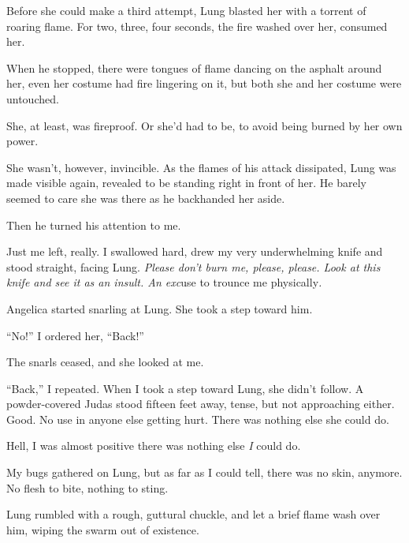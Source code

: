 Before she could make a third attempt, Lung blasted her with a torrent of roaring flame.  For two, three, four seconds, the fire washed over her, consumed her.



When he stopped, there were tongues of flame dancing on the asphalt around her, even her costume had fire lingering on it, but both she and her costume were untouched.



She, at least, was fireproof.  Or she'd had to be, to avoid being burned by her own power.



She wasn't, however, invincible.  As the flames of his attack dissipated, Lung was made visible again, revealed to be standing right in front of her.  He barely seemed to care she was there as he backhanded her aside.



Then he turned his attention to me.



Just me left, really.  I swallowed hard, drew my very underwhelming knife and stood straight, facing Lung.  \emph{Please don't burn me, please, please.  Look at this knife and see it as an insult.  An exc}use to trounce me physically\emph{.}



Angelica started snarling at Lung.  She took a step toward him.



``No!'' I ordered her, ``Back!''



The snarls ceased, and she looked at me.



``Back,'' I repeated.  When I took a step toward Lung, she didn't follow.  A powder-covered Judas stood fifteen feet away, tense, but not approaching either.  Good.  No use in anyone else getting hurt.  There was nothing else she could do.



Hell, I was almost positive there was nothing else \emph{I }could do.



My bugs gathered on Lung, but as far as I could tell, there was no skin, anymore.  No flesh to bite, nothing to sting.



Lung rumbled with a rough, guttural chuckle, and let a brief flame wash over him, wiping the swarm out of existence.



